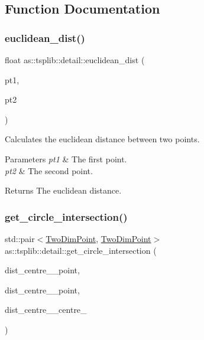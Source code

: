 \subsection{Function Documentation}
\mbox{\label{namespaceas_1_1tsplib_1_1detail_a6b7b8b134e00f78387c5fe70f5791572}} 
\subsubsection{\texorpdfstring{euclidean\+\_\+dist()}{euclidean\_dist()}}
{\footnotesize\ttfamily float as\+::tsplib\+::detail\+::euclidean\+\_\+dist (\begin{DoxyParamCaption}\item[{const \hyperlink{structas_1_1TwoDimPoint}{Two\+Dim\+Point} \&}]{pt1,  }\item[{const \hyperlink{structas_1_1TwoDimPoint}{Two\+Dim\+Point} \&}]{pt2 }\end{DoxyParamCaption})\hspace{0.3cm}{\ttfamily [inline]}}



Calculates the euclidean distance between two points. 


\begin{DoxyParams}{Parameters}
{\em pt1} & The first point. \\
\hline
{\em pt2} & The second point. \\
\hline
\end{DoxyParams}
\begin{DoxyReturn}{Returns}
The euclidean distance. 
\end{DoxyReturn}
\mbox{\label{namespaceas_1_1tsplib_1_1detail_a1337beecf37622b3597de699f3852380}} 
\subsubsection{\texorpdfstring{get\+\_\+circle\+\_\+intersection()}{get\_circle\_intersection()}}
{\footnotesize\ttfamily std\+::pair$<$\hyperlink{structas_1_1TwoDimPoint}{Two\+Dim\+Point}, \hyperlink{structas_1_1TwoDimPoint}{Two\+Dim\+Point}$>$ as\+::tsplib\+::detail\+::get\+\_\+circle\+\_\+intersection (\begin{DoxyParamCaption}\item[{float}]{dist\+\_\+centre\+\_\+\_\+point,  }\item[{float}]{dist\+\_\+centre\+\_\+\_\+point,  }\item[{float}]{dist\+\_\+centre\+\_\+\_\+centre\+\_ }\end{DoxyParamCaption})\hspace{0.3cm}{\ttfamily [inline]}}



